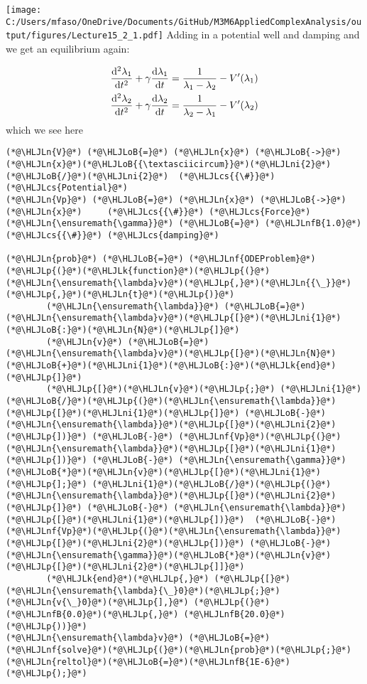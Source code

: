 \documentclass[12pt,landscape]{article}
\newcommand{\HLJLk}[1]{\textcolor[RGB]{148,91,176}{\textbf{#1}}}
\newcommand{\HLJLn}[1]{#1}
\newcommand{\HLJLnf}[1]{\textcolor[RGB]{66,102,213}{#1}}
\newcommand{\HLJLnfB}[1]{\textcolor[RGB]{59,151,46}{#1}}
\newcommand{\HLJLni}[1]{\textcolor[RGB]{59,151,46}{#1}}
\newcommand{\HLJLoB}[1]{\textcolor[RGB]{102,102,102}{\textbf{#1}}}
\newcommand{\HLJLp}[1]{#1}
\newcommand{\HLJLcs}[1]{\textcolor[RGB]{153,153,119}{\textit{#1}}}
\def\D{ {\rm d} }
\def\dt{\D t}
\begin{document}
{\texttt{[image: C:/Users/mfaso/OneDrive/Documents/GitHub/M3M6AppliedComplexAnalysis/output/figures/Lecture15\_2\_1.pdf]}
\newpage
Adding in a potential well and damping and we get an equilibrium again:


\begin{align*}
{\D^2 \lambda_1 \over \D t^2} + \gamma {\D \lambda_1 \over \dt} = {1 \over \lambda_1 -\lambda_2} - V'(\lambda_1) \\
{\D^2 \lambda_2 \over \D t^2}+ \gamma {\D \lambda_2 \over \dt} = {1 \over \lambda_2 -\lambda_1} - V'(\lambda_2)
\end{align*}
which we see here


\begin{lstlisting}
(*@\HLJLn{V}@*) (*@\HLJLoB{=}@*) (*@\HLJLn{x}@*) (*@\HLJLoB{->}@*) (*@\HLJLn{x}@*)(*@\HLJLoB{{\textasciicircum}}@*)(*@\HLJLni{2}@*)(*@\HLJLoB{/}@*)(*@\HLJLni{2}@*)  (*@\HLJLcs{{\#}}@*) (*@\HLJLcs{Potential}@*)
(*@\HLJLn{Vp}@*) (*@\HLJLoB{=}@*) (*@\HLJLn{x}@*) (*@\HLJLoB{->}@*) (*@\HLJLn{x}@*)     (*@\HLJLcs{{\#}}@*) (*@\HLJLcs{Force}@*)
(*@\HLJLn{\ensuremath{\gamma}}@*) (*@\HLJLoB{=}@*) (*@\HLJLnfB{1.0}@*)    (*@\HLJLcs{{\#}}@*) (*@\HLJLcs{damping}@*)

(*@\HLJLn{prob}@*) (*@\HLJLoB{=}@*) (*@\HLJLnf{ODEProblem}@*)(*@\HLJLp{(}@*)(*@\HLJLk{function}@*)(*@\HLJLp{(}@*)(*@\HLJLn{\ensuremath{\lambda}v}@*)(*@\HLJLp{,}@*)(*@\HLJLn{{\_}}@*)(*@\HLJLp{,}@*)(*@\HLJLn{t}@*)(*@\HLJLp{)}@*)
        (*@\HLJLn{\ensuremath{\lambda}}@*) (*@\HLJLoB{=}@*) (*@\HLJLn{\ensuremath{\lambda}v}@*)(*@\HLJLp{[}@*)(*@\HLJLni{1}@*)(*@\HLJLoB{:}@*)(*@\HLJLn{N}@*)(*@\HLJLp{]}@*)
        (*@\HLJLn{v}@*) (*@\HLJLoB{=}@*) (*@\HLJLn{\ensuremath{\lambda}v}@*)(*@\HLJLp{[}@*)(*@\HLJLn{N}@*)(*@\HLJLoB{+}@*)(*@\HLJLni{1}@*)(*@\HLJLoB{:}@*)(*@\HLJLk{end}@*)(*@\HLJLp{]}@*)
        (*@\HLJLp{[}@*)(*@\HLJLn{v}@*)(*@\HLJLp{;}@*) (*@\HLJLni{1}@*)(*@\HLJLoB{/}@*)(*@\HLJLp{(}@*)(*@\HLJLn{\ensuremath{\lambda}}@*)(*@\HLJLp{[}@*)(*@\HLJLni{1}@*)(*@\HLJLp{]}@*) (*@\HLJLoB{-}@*) (*@\HLJLn{\ensuremath{\lambda}}@*)(*@\HLJLp{[}@*)(*@\HLJLni{2}@*)(*@\HLJLp{])}@*) (*@\HLJLoB{-}@*) (*@\HLJLnf{Vp}@*)(*@\HLJLp{(}@*)(*@\HLJLn{\ensuremath{\lambda}}@*)(*@\HLJLp{[}@*)(*@\HLJLni{1}@*)(*@\HLJLp{])}@*) (*@\HLJLoB{-}@*) (*@\HLJLn{\ensuremath{\gamma}}@*)(*@\HLJLoB{*}@*)(*@\HLJLn{v}@*)(*@\HLJLp{[}@*)(*@\HLJLni{1}@*)(*@\HLJLp{];}@*) (*@\HLJLni{1}@*)(*@\HLJLoB{/}@*)(*@\HLJLp{(}@*)(*@\HLJLn{\ensuremath{\lambda}}@*)(*@\HLJLp{[}@*)(*@\HLJLni{2}@*)(*@\HLJLp{]}@*) (*@\HLJLoB{-}@*) (*@\HLJLn{\ensuremath{\lambda}}@*)(*@\HLJLp{[}@*)(*@\HLJLni{1}@*)(*@\HLJLp{])}@*)  (*@\HLJLoB{-}@*) (*@\HLJLnf{Vp}@*)(*@\HLJLp{(}@*)(*@\HLJLn{\ensuremath{\lambda}}@*)(*@\HLJLp{[}@*)(*@\HLJLni{2}@*)(*@\HLJLp{])}@*) (*@\HLJLoB{-}@*) (*@\HLJLn{\ensuremath{\gamma}}@*)(*@\HLJLoB{*}@*)(*@\HLJLn{v}@*)(*@\HLJLp{[}@*)(*@\HLJLni{2}@*)(*@\HLJLp{]]}@*)
        (*@\HLJLk{end}@*)(*@\HLJLp{,}@*) (*@\HLJLp{[}@*)(*@\HLJLn{\ensuremath{\lambda}{\_}0}@*)(*@\HLJLp{;}@*) (*@\HLJLn{v{\_}0}@*)(*@\HLJLp{],}@*) (*@\HLJLp{(}@*)(*@\HLJLnfB{0.0}@*)(*@\HLJLp{,}@*) (*@\HLJLnfB{20.0}@*)(*@\HLJLp{))}@*)
(*@\HLJLn{\ensuremath{\lambda}v}@*) (*@\HLJLoB{=}@*) (*@\HLJLnf{solve}@*)(*@\HLJLp{(}@*)(*@\HLJLn{prob}@*)(*@\HLJLp{;}@*) (*@\HLJLn{reltol}@*)(*@\HLJLoB{=}@*)(*@\HLJLnfB{1E-6}@*)(*@\HLJLp{);}@*)


\end{lstlisting}}
\end{document}
